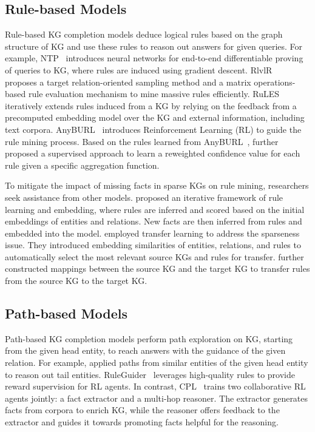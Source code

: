 \documentclass[sigconf]{acmart}
\begin{document}
\subsection{Rule-based Models}
Rule-based KG completion models deduce logical rules based on the graph structure of KG and use these rules to reason out answers for given queries. For example, NTP~\cite{NTP} introduces neural networks for end-to-end differentiable proving of queries to KG, where rules are induced using gradient descent. RlvlR~\cite{RlvlR} proposes a target relation-oriented sampling method and a matrix operations-based rule evaluation mechanism to mine massive rules efficiently. RuLES~\cite{RuLES} iteratively extends rules induced from a KG by relying on the feedback from a precomputed embedding model over the KG and external information, including text corpora. AnyBURL~\cite{AnyBURL} introduces Reinforcement Learning (RL) to guide the rule mining process. Based on the rules learned from AnyBURL~\cite{AnyBURL}, \citet{Rule-KGC-2024} further proposed a supervised approach to learn a reweighted confidence value for each rule given a specific aggregation function.

To mitigate the impact of missing facts in sparse KGs on rule mining, researchers seek assistance from other models. \citet{SKGC2020-Structure} proposed an iterative framework of rule learning and embedding, where rules are inferred and scored based on the initial embeddings of entities and relations. New facts are then inferred from rules and embedded into the model. \citet{Rule-SKGC-2019} employed transfer learning to address the sparseness issue. They introduced embedding similarities of entities, relations, and rules to automatically select the most relevant source KGs and rules for transfer. \citet{Rule-SKGC-2023} further constructed mappings between the source KG and the target KG to transfer rules from the source KG to the target KG.

\subsection{Path-based Models}
Path-based KG completion models perform path exploration on KG, starting from the given head entity, to reach answers with the guidance of the given relation. For example, \citet{pr_cbr1,pr_cbr2} applied paths from similar entities of the given head entity to reason out tail entities. RuleGuider~\cite{RuleGuider} leverages high-quality rules to provide reward supervision for RL agents. In contrast, CPL~\cite{CPL} trains two collaborative RL agents jointly: a fact extractor and a multi-hop reasoner. The extractor generates facts from corpora to enrich KG, while the reasoner offers feedback to the extractor and guides it towards promoting facts helpful for the reasoning. 
\end{document}
